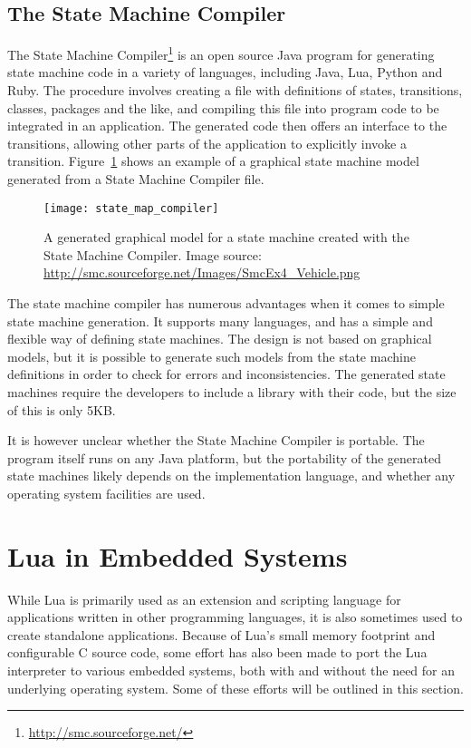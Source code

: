\subsection{The State Machine Compiler}
\label{sec:state_machine_compiler}
The State Machine Compiler\footnote{\url{http://smc.sourceforge.net/}} is an open source Java program for generating state machine code in a variety of languages, including Java, Lua, Python and Ruby. The procedure involves creating a file with definitions of states, transitions, classes, packages and the like, and compiling this file into program code to be integrated in an application. The generated code then offers an interface to the transitions, allowing other parts of the application to explicitly invoke a transition. Figure~\ref{fig:state_map_compiler} shows an example of a graphical state machine model generated from a State Machine Compiler file.

\begin{figure}[htp]
	\centering
	\texttt{[image: state\_map\_compiler]}
	\caption[A state machine created with the State Machine Compiler]{A generated graphical model for a state machine created with the State Machine Compiler. Image source: \url{http://smc.sourceforge.net/Images/SmcEx4_Vehicle.png}} \label{fig:state_map_compiler}
\end{figure}

\noindent
The state machine compiler has numerous advantages when it comes to simple state machine generation. It supports many languages, and has a simple and flexible way of defining state machines. The design is not based on graphical models, but it is possible to generate such models from the state machine definitions in order to check for errors and inconsistencies. The generated state machines require the developers to include a library with their code, but the size of this is only 5KB.

\noindent
It is however unclear whether the State Machine Compiler is portable. The program itself runs on any Java platform, but the portability of the generated state machines likely depends on the implementation language, and whether any operating system facilities are used.

\section{Lua in Embedded Systems}
\label{sec:lua_in_embedded}
While Lua is primarily used as an extension and scripting language for applications written in other programming languages, it is also sometimes used to create standalone applications. Because of Lua's small memory footprint and configurable C source code, some effort has also been made to port the Lua interpreter to various embedded systems, both with and without the need for an underlying operating system. Some of these efforts will be outlined in this section.

